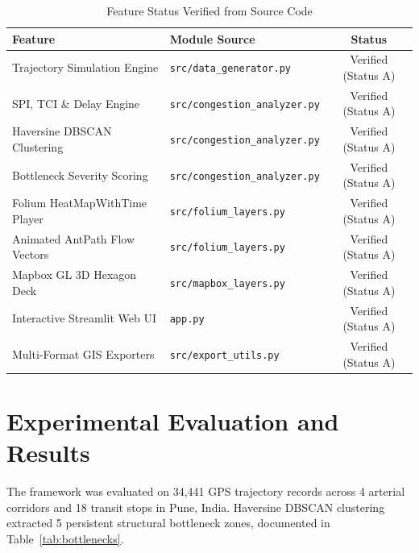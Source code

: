 \documentclass[conference]{IEEEtran}
\begin{document}
\begin{table}[h]
\caption{Feature Status Verified from Source Code}
\centering
\begin{tabular}{@{}llc@{}}
\toprule
\textbf{Feature} & \textbf{Module Source} & \textbf{Status} \\
\midrule
Trajectory Simulation Engine & \texttt{src/data\_generator.py} & Verified (Status A) \\
SPI, TCI \& Delay Engine & \texttt{src/congestion\_analyzer.py} & Verified (Status A) \\
Haversine DBSCAN Clustering & \texttt{src/congestion\_analyzer.py} & Verified (Status A) \\
Bottleneck Severity Scoring & \texttt{src/congestion\_analyzer.py} & Verified (Status A) \\
Folium HeatMapWithTime Player & \texttt{src/folium\_layers.py} & Verified (Status A) \\
Animated AntPath Flow Vectors & \texttt{src/folium\_layers.py} & Verified (Status A) \\
Mapbox GL 3D Hexagon Deck & \texttt{src/mapbox\_layers.py} & Verified (Status A) \\
Interactive Streamlit Web UI & \texttt{app.py} & Verified (Status A) \\
Multi-Format GIS Exporters & \texttt{src/export\_utils.py} & Verified (Status A) \\
\bottomrule
\end{tabular}
\label{tab:features}
\end{table}

\section{Experimental Evaluation and Results}
The framework was evaluated on 34,441 GPS trajectory records across 4 arterial corridors and 18 transit stops in Pune, India. Haversine DBSCAN clustering extracted 5 persistent structural bottleneck zones, documented in Table~\ref{tab:bottlenecks}.
\end{document}
